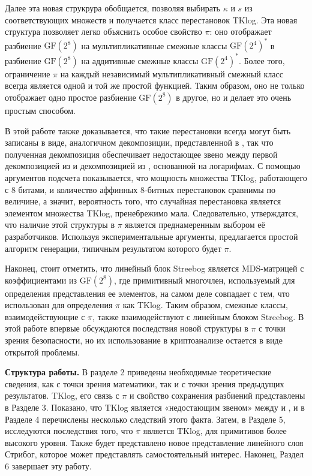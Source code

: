 Далее эта новая струкрура обобщается, позволяя выбирать \(\kappa\) и \(s\) из соответствующих множеств и получается класс перестановок TKlog. Эта новая структура позволяет легко объяснить особое свойство \(\pi\): оно отображает разбиение \(\text{GF}(2^8)\) на мультипликативные смежные классы \(\text{GF}(2^4)^*\) в разбиение \(\text{GF}(2^8)\) на аддитивные смежные классы \(\text{GF}(2^4)^*\). Более того, ограничение \(\pi\) на каждый независимый мультипликативный смежный класс всегда является одной и той же простой функцией. Таким образом, оно не только отображает одно простое разбиение \(\text{GF}(2^8)\) в другое, но и делает это очень простым способом.

В этой работе также доказывается, что такие перестановки всегда могут быть записаны в виде, аналогичном декомпозиции, представленной в \cite{BPU16a}, так что полученная декомпозиция обеспечивает недостающее звено между первой декомпозицией из \cite{BPU16a} и декомпозицией из \cite{PU16}, основанной на логарифмах. С помощью аргументов подсчета показывается, что мощность множества TKlog, работающего с 8 битами, и количество аффинных 8-битных перестановок сравнимы по величине, а значит, вероятность того, что случайная перестановка является элементом множества TKlog, пренебрежимо мала. Следовательно, утверждатся, что наличие этой структуры в \(\pi\) является преднамеренным выбором её разработчиков. Используя экспериментальные аргументы, предлагается простой алгоритм генерации, типичным результатом которого будет \(\pi\).

Наконец, стоит отметить, что линейный блок Streebog является MDS-матрицей с коэффициентами из \(\text{GF}(2^8)\), где примитивный многочлен, используемый для определения представления ее элементов, на самом деле совпадает с тем, что использован для определения \(\pi\) как TKlog. Таким образом, смежные классы, взаимодействующие с \(\pi\), также взаимодействуют с линейным блоком Streebog. В этой работе впервые обсуждаются последствия новой структуры в \(\pi\) с точки зрения безопасности, но их использование в криптоанализе остается в виде открытой проблемы.

\textbf{Структура работы.} В разделе 2 приведены необходимые теоретические сведения, как с точки зрения математики, так и с точки зрения предыдущих результатов. TKlog, его связь с \(\pi\) и свойство сохранения разбиений представлены в Разделе 3. Показано, что TKlog является «недостающим звеном» между \cite{BPU16a} и \cite{PU16}, и в Разделе 4 перечислены несколько следствий этого факта. Затем, в Разделе 5, исследуются последствия того, что \(\pi\) является TKlog, для примитивов более высокого уровня. Также будет представлено новое представление линейного слоя Стрибог, которое может представлять самостоятельный интерес. Наконец, Раздел 6 завершает эту работу.
